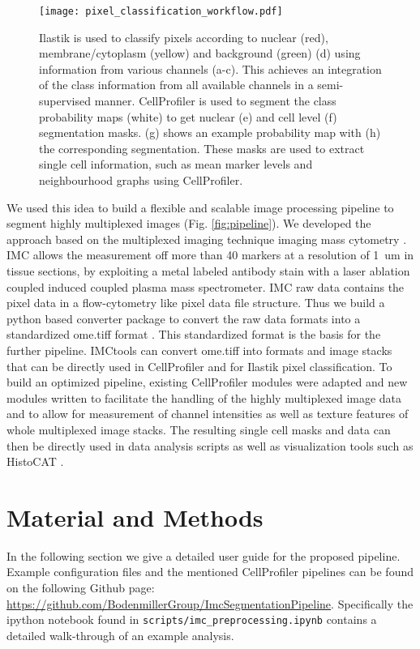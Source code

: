 \documentclass[a4paper]{article}
\begin{document}
\begin{figure}[htb]
\centering
\texttt{[image: pixel\_classification\_workflow.pdf]}
\caption{Ilastik is used to classify pixels according to nuclear
(red), membrane/cytoplasm (yellow) and background (green) (d)
using information from various channels (a-c). This achieves an
integration of the class information from all available channels in a
semi-supervised manner. CellProfiler is used to segment the class probability maps (white)
to get nuclear (e) and cell level (f) segmentation masks.
	(g) shows an example probability
	map with (h) the corresponding segmentation. These masks are used to extract single cell information, such as mean
marker levels and neighbourhood graphs using CellProfiler.
\label{fig:class}
} 
\end{figure}


We used this idea to build a flexible and scalable image processing pipeline to segment highly
multiplexed images (Fig. \ref{fig:pipeline}). We developed the approach  based on the multiplexed imaging technique imaging mass
cytometry \cite{giesen_highly_2014}. IMC allows the measurement off more
than 40 markers at a resolution of 1\ um in tissue sections, by exploiting a metal labeled antibody
stain with a laser ablation coupled induced coupled plasma mass spectrometer. IMC raw data contains
the pixel data in a flow-cytometry like pixel data file structure. Thus we build a python based
converter package to convert the raw data formats into a standardized ome.tiff format
\cite{goldberg_open_2005}. This standardized format is the basis for the further pipeline. IMCtools
can convert ome.tiff into formats and image stacks that can be directly used in CellProfiler and for Ilastik pixel classification.
To build an optimized pipeline, existing CellProfiler modules were adapted and new modules written to facilitate the handling of the
highly multiplexed image data and to allow for measurement of channel intensities as well as texture features of
whole multiplexed image stacks. The resulting single cell masks and data can then be directly used in data
analysis scripts as well as visualization tools such as HistoCAT \cite{schapiro_histocat:_2017}. 

\newpage
\section{Material and Methods}
In the following section we give a detailed user guide for the proposed pipeline. Example
configuration files and the mentioned CellProfiler pipelines can be found on the following Github page: \url{https://github.com/BodenmillerGroup/ImcSegmentationPipeline}.
Specifically the ipython notebook found in \texttt{scripts/imc\_preprocessing.ipynb} contains a detailed walk-through of an example analysis.
\end{document}
